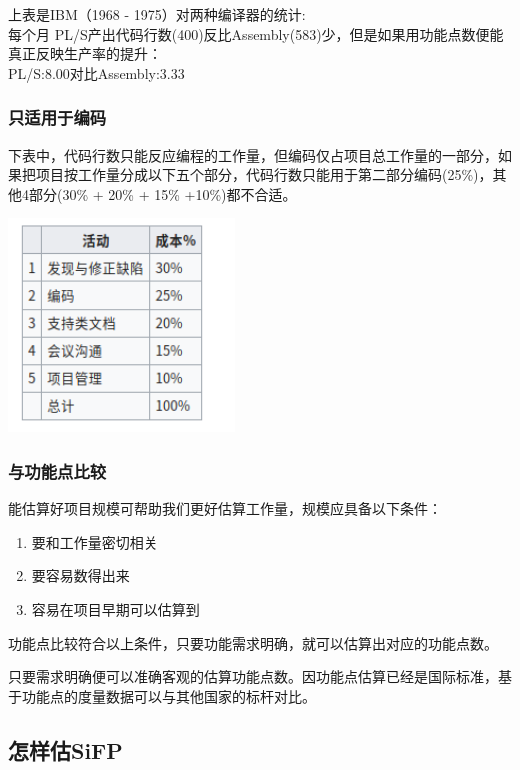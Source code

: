上表是IBM（1968 - 1975）对两种编译器的统计:\\
每个月
PL/S产出代码行数(400)反比Assembly(583)少，但是如果用功能点数便能真正反映生产率的提升：\\
PL/S:8.00对比Assembly:3.33

\hypertarget{ux53eaux9002ux7528ux4e8eux7f16ux7801}{%
\subsubsection{只适用于编码}\label{ux53eaux9002ux7528ux4e8eux7f16ux7801}}

下表中，代码行数只能反应编程的工作量，但编码仅占项目总工作量的一部分，如果把项目按工作量分成以下五个部分，代码行数只能用于第二部分编码(25\%)，其他4部分(30\%
+ 20\% + 15\% +10\%)都不合适。

\includegraphics[width=6cm]{Screenshotfrom2023-11-1302-00-20.png}

\hypertarget{ux4e0eux529fux80fdux70b9ux6bd4ux8f83}{%
\subsubsection{与功能点比较}\label{ux4e0eux529fux80fdux70b9ux6bd4ux8f83}}

能估算好项目规模可帮助我们更好估算工作量，规模应具备以下条件：

\begin{enumerate}
\tightlist
\item
  要和工作量密切相关
\item
  要容易数得出来
\item
  容易在项目早期可以估算到
\end{enumerate}

功能点比较符合以上条件，只要功能需求明确，就可以估算出对应的功能点数。

只要需求明确便可以准确客观的估算功能点数。因功能点估算已经是国际标准，基于功能点的度量数据可以与其他国家的标杆对比。

\hypertarget{ux600eux6837ux4f30sifp}{%
\subsection{怎样估SiFP}\label{ux600eux6837ux4f30sifp}}

